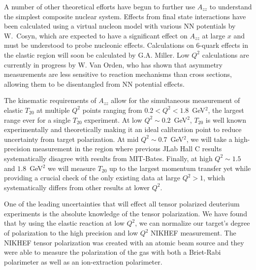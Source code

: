 A number of other theoretical efforts have begun to further use $A_{zz}$ to understand the simplest composite nuclear system. Effects from final state interactions have been calculated using a virtual nucleon model with various NN potentials by W.~Cosyn, which are expected to have a significant effect on $A_{zz}$ at large $x$ and must be understood to probe nucleonic effects. Calculations on 6-quark effects in the elastic region will soon be calculated by G.A. Miller. Low $Q^2$ calculations are currently in progress by W. Van Orden, who has shown that asymmetry measurements are less sensitive to reaction mechanisms than cross sections, allowing them to be disentangled from NN potential effects. 


The kinematic requirements of $A_{zz}$ allow for the simultaneous measurement of elastic $T_{20}$ at multiple $Q^2$ points ranging from $0.2<Q^2<1.8$~GeV$^2$, the largest range ever for a single $T_{20}$ experiment. At low $Q^2\sim0.2$~GeV$^2$, $T_{20}$ is well known experimentally and theoretically making it an ideal calibration point to reduce uncertainty from target polarization. At mid $Q^2\sim0.7$~GeV$^2$, we will take a high-precision measurement in the region where previous JLab Hall C results systematically disagree with results from MIT-Bates. Finally, at high $Q^2\sim1.5$ and $1.8$~GeV$^2$ we will measure $T_{20}$ up to the largest momentum transfer yet while providing a crucial check of the only existing data at large $Q^2>1$, which systematically differs from other results at lower $Q^2$.

One of the leading uncertainties that will effect all tensor polarized deuterium experiments is the absolute knowledge of the tensor polarization.   We have found that by using the elastic reaction at low $Q^2$, we can normalize our target's degree of polarization to the high precision and low $Q^2$ NIKHEF measurement.  The NIKHEF tensor polarization was created with an atomic beam source and they were able to measure the polarization of the gas with both a Briet-Rabi polarimeter as well as an ion-extraction polarimeter. 


